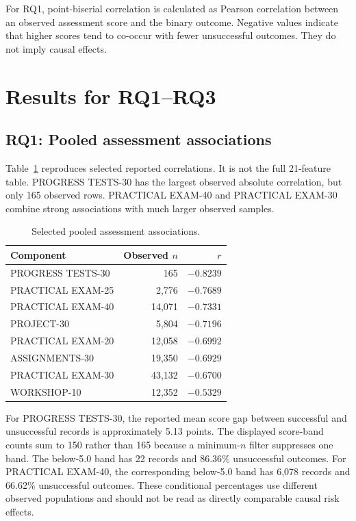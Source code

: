 \documentclass[conference]{IEEEtran}
\begin{document}
For RQ1, point-biserial correlation is calculated as Pearson correlation between an observed assessment score and the binary outcome. Negative values indicate that higher scores tend to co-occur with fewer unsuccessful outcomes. They do not imply causal effects.

\section{Results for RQ1--RQ3}
\subsection{RQ1: Pooled assessment associations}
Table~\ref{tab:assoc} reproduces selected reported correlations. It is not the full 21-feature table. PROGRESS TESTS-30 has the largest observed absolute correlation, but only 165 observed rows. PRACTICAL EXAM-40 and PRACTICAL EXAM-30 combine strong associations with much larger observed samples.

\begin{table}[t]
\centering\small
\caption{Selected pooled assessment associations.}
\label{tab:assoc}
\begin{tabular}{lrr}
\toprule Component & Observed $n$ & $r$\\\midrule
PROGRESS TESTS-30&165&$-0.8239$\\
PRACTICAL EXAM-25&2,776&$-0.7689$\\
PRACTICAL EXAM-40&14,071&$-0.7331$\\
PROJECT-30&5,804&$-0.7196$\\
PRACTICAL EXAM-20&12,058&$-0.6992$\\
ASSIGNMENTS-30&19,350&$-0.6929$\\
PRACTICAL EXAM-30&43,132&$-0.6700$\\
WORKSHOP-10&12,352&$-0.5329$\\\bottomrule
\end{tabular}
\end{table}

For PROGRESS TESTS-30, the reported mean score gap between successful and unsuccessful records is approximately 5.13 points. The displayed score-band counts sum to 150 rather than 165 because a minimum-$n$ filter suppresses one band. The below-5.0 band has 22 records and 86.36\% unsuccessful outcomes. For PRACTICAL EXAM-40, the corresponding below-5.0 band has 6,078 records and 66.62\% unsuccessful outcomes. These conditional percentages use different observed populations and should not be read as directly comparable causal risk effects.
\end{document}
